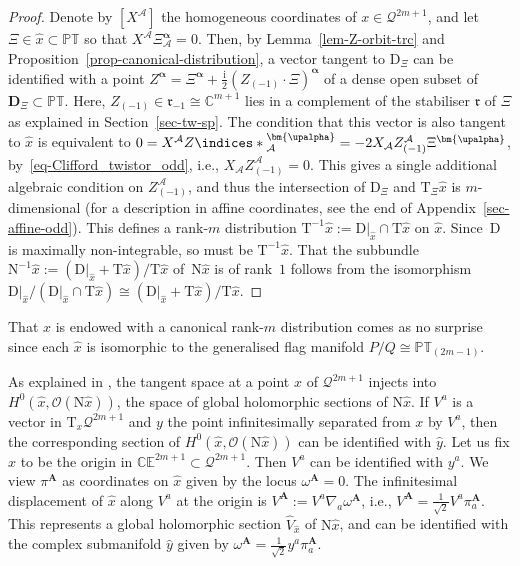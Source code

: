 \documentclass[pdftex]{sigma}
\numberwithin{equation}{section}
\newcommand{\mbf} [1]{\mathbf{#1}}
\newcommand{\mc} [1]{\mathcal{#1}}
\newcommand{\Drm} {{\mathrm{D}}}
\newcommand{\ii} {\mathrm{i}}
\newcommand{\ind} {\indices}
\newcommand{\Tgt} {\mathrm{T}}
\newcommand{\Nrm} {\mathrm{N}}
\newcommand{\mfr} {\mathfrak{r}}
\newcommand{\PT} {\mathbb{PT}}
\newcommand{\E} {\mathbb{E}}
\newcommand{\C} {\mathbb{C}}
\begin{document}
\begin{proof}
Denote by $[X^\mc{A}]$ the homogeneous coordinates of $x \in \mc{Q}^{2m+1}$, and let $\Xi \in \hat{x} \subset \PT$ so that $X^\mc{A} \Xi_\mc{A}^{\bm{\upalpha}} =0$. Then, by Lemma~\ref{lem-Z-orbit-trc} and Proposition~\ref{prop-canonical-distribution}, a vector tangent to $\Drm_\Xi$ can be identif\/ied with a point $Z^{\bm{\upalpha}} = \Xi^{\bm{\upalpha}} + \frac{\ii}{2} ( Z_{(-1)} \cdot \Xi )^{\bm{\upalpha}}$ of a dense open subset of $\mbf{D}_\Xi \subset \PT$. Here, $Z_{(-1)} \in \mfr_{-1} \cong \C^{m+1}$ lies in a complement of the stabiliser $\mfr$ of $\Xi$ as explained in Section~\ref{sec-tw-sp}. The condition that this vector is also tangent to $\hat{x}$ is equivalent to $0 = X^\mc{A} Z \ind*{_{\mc{A}}^{\bm{\upalpha}}} = - 2 X_\mc{A} Z^\mc{A}_{(-1)} \Xi^{\bm{\upalpha}}$, by~\eqref{eq-Clifford_twistor_odd}, i.e., $X_\mc{A} Z^\mc{A}_{(-1)} =0$. This gives a single additional algebraic condition on $Z_{(-1)}^\mc{A}$, and thus the intersection of $\mathrm{D}_\Xi$ and $\Tgt_\Xi \hat{x}$ is $m$-dimensional (for a description in af\/f\/ine coordinates, see the end of Appendix~\ref{sec-affine-odd}). This def\/ines a rank-$m$ distribution $\Tgt^{-1} \hat{x} := \mathrm{D} |_{\hat{x}} \cap \Tgt \hat{x}$ on $\hat{x}$. Since~$\mathrm{D}$ is maximally non-integrable, so must be $\Tgt^{-1} \hat{x}$. That the subbundle $\Nrm^{-1} \hat{x} := ( \mathrm{D} |_{\hat{x}} + \Tgt \hat{x})/\Tgt \hat{x}$ of~$\mathrm{N} \hat{x}$ is of rank~$1$ follows from the isomorphism $ \mathrm{D}|_{\hat{x}} /( \mathrm{D} |_{\hat{x}} \cap \Tgt \hat{x} ) \cong ( \mathrm{D} |_{\hat{x}} + \Tgt \hat{x} )/\Tgt \hat{x}$.
\end{proof}

That $\hat{x}$ is endowed with a canonical rank-$m$ distribution comes as no surprise since each $\hat{x}$ is isomorphic to the generalised f\/lag manifold $P/Q \cong \PT_{(2m-1)}$.

As explained in \cite{Kodaira1962}, the tangent space at a point $x$ of $\mc{Q}^{2m+1}$ injects into $H^0(\hat{x}, \mc{O}(\Nrm \hat{x}))$, the space of global holomorphic sections of $\Nrm \hat{x}$. If $V^a$ is a vector in $\Tgt_x \mc{Q}^{2m+1}$ and $y$ the point inf\/initesimally separated from $x$ by $V^a$, then the corresponding section of $H^0(\hat{x}, \mc{O}(\Nrm \hat{x}))$ can be identif\/ied with $\hat{y}$. Let us f\/ix $x$ to be the origin in $\C\E^{2m+1} \subset \mc{Q}^{2m+1}$. Then $V^a$ can be identif\/ied with $y^a$. We view $\pi^{\mbf{A}}$ as coordinates on $\hat{x}$ given by the locus $\omega^{\mbf{A}}=0$. The inf\/initesimal displacement of $\hat{x}$ along $V^a$ at the origin is $V^\mbf{A} := V^a \nabla_a \omega^{\mbf{A}}$, i.e., $V^\mbf{A} = \frac{1}{\sqrt{2}} V^a \pi_a^\mbf{A}$. This represents a global holomorphic section $\widehat{V}_{\hat{x}}$ of $\Nrm \hat{x}$, and can be identif\/ied with the complex submanifold $\hat{y}$ given by $\omega^{\mbf{A}} = \frac{1}{\sqrt{2}} y^a \pi_a^{\mbf{A}}$.
\end{document}

